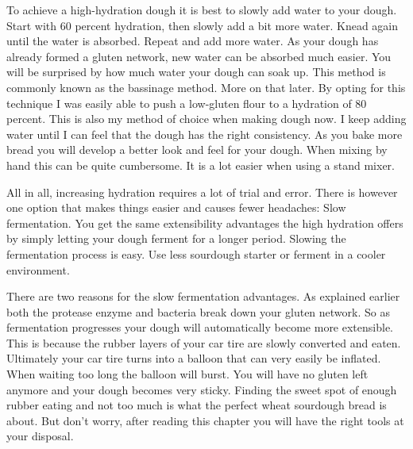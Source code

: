 To achieve a high-hydration dough it is best to slowly add water to
your dough. Start with 60 percent hydration, then slowly add a bit more water. Knead
again until the water is absorbed. Repeat and add more water. As your dough
has already formed a gluten network, new water can be absorbed much easier.
You will be surprised by how much water your dough can soak up. This
method is commonly known as the bassinage method. More on that later.
By opting for this technique I was easily able to push a low-gluten flour to a hydration of 80 percent. This
is also my method of choice when making dough now. I keep adding water until
I can feel that the dough has the right consistency. As you bake more bread
you will develop a better look and feel for your dough. When mixing
by hand this can be quite cumbersome. It is a lot easier when using a stand
mixer.

All in all, increasing hydration requires a lot of trial and error. There
is however one option that makes things easier and causes fewer headaches:
Slow fermentation. You get the same extensibility advantages the high hydration
offers by simply letting your dough ferment for a longer period.
Slowing the fermentation process is easy. Use less
sourdough starter or ferment in a cooler environment.

There are two reasons for the slow fermentation advantages.
As explained earlier both the protease enzyme and bacteria break down your
gluten network. So as fermentation progresses your dough will automatically
become more extensible. This is because the rubber layers of your car tire
are slowly converted and eaten. Ultimately your car tire turns into a balloon
that can very easily be inflated.  When waiting too long the
balloon will burst. You will have no gluten left anymore and your dough
becomes very sticky. Finding the sweet spot of enough rubber eating and not
too much is what the perfect wheat sourdough bread is about. But don't worry, after reading
this chapter you will have the right tools at your disposal.

